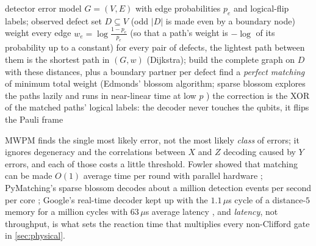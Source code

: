 \begin{algorithm}[H]
\caption{Minimum-weight perfect matching (MWPM) decoding of a surface-code memory}\label{alg:mwpm}
\begin{algorithmic}[1]
\Require detector error model $G=(V,E)$ with edge probabilities $p_e$ and logical-flip labels; observed defect set $D\subseteq V$ (odd $|D|$ is made even by a boundary node)
\State weight every edge $w_e=\log\frac{1-p_e}{p_e}$ (so that a path's weight is $-\log$ of its probability up to a constant)
\State for every pair of defects, the lightest path between them is the shortest path in $(G,w)$ (Dijkstra); build the complete graph on $D$ with these distances, plus a boundary partner per defect
\State find a \emph{perfect matching} of minimum total weight (Edmonds' blossom algorithm; sparse blossom explores the paths lazily and runs in near-linear time at low $p$ \cite{higgott23pymatching})
\State the correction is the XOR of the matched paths' logical labels: the decoder never touches the qubits, it flips the Pauli frame
\end{algorithmic}
\end{algorithm}

MWPM finds the single most likely error, not the most likely \emph{class} of errors; it ignores degeneracy and the correlations between $X$ and $Z$ decoding caused by $Y$ errors, and each of those costs a little threshold. Fowler showed that matching can be made $O(1)$ average time per round with parallel hardware \cite{fowler13mwpm}; PyMatching's sparse blossom decodes about a million detection events per second per core \cite{higgott23pymatching}; Google's real-time decoder kept up with the $1.1\,\mu$s cycle of a distance-$5$ memory for a million cycles with $63\,\mu$s average latency \cite{willow25}, and \emph{latency}, not throughput, is what sets the reaction time that multiplies every non-Clifford gate in \cref{sec:physical}.

